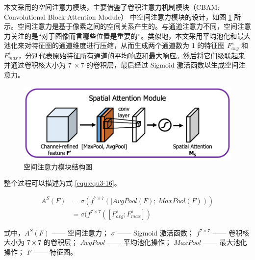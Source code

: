 本文采用的空间注意力模块，主要借鉴了卷积注意力机制模块（CBAM: Convolutional Block Attention Module）\cite{DBLP:conf/eccv/WooPLK18} 中空间注意力模块的设计，如图 \ref{fig:fig3-7} 所示。空间注意力是基于像素之间的空间关系产生的。与通道注意力不同，空间注意力关注的是“对于图像而言哪些位置是重要的”。类似地，本文采用平均池化和最大池化来对特征图的通道维度进行压缩，从而生成两个通道数为 1 的特征图 $F_{avg}^s$ 和 $F_{max}^s$，分别代表原始特征所有通道的平均响应和最大响应。然后将它们级联起来并通过卷积核大小为 $7\ \times 7$ 的卷积层，最后经过 Sigmoid 激活函数以生成空间注意力。

\begin{figure}[!htbp]
	\centering
	\includegraphics{figures/24.png}
	\caption{空间注意力模块结构图}
	\label{fig:fig3-7}
	\vspace{-0.8cm}  %
\end{figure}

整个过程可以描述为式 \ref{equ:equ3-16}。

\begin{equation}
\begin{aligned}
	A^S\left(F\right)&=\sigma\left(f^{7\times7}\left([AvgPool\left(F\right);\ MaxPool\left(F\right)\right)\right)\\
	&=\sigma(f^{7\times 7}([F_{avg}^s; F_{max}^s])
\end{aligned}
\label{equ:equ3-16}
\end{equation}

\noindent 式中，$A^S\left(F\right)$ —— 空间注意力；\newline
\indent\quad $\sigma$ —— Sigmoid 激活函数；\newline
\indent\quad $f^{7\times7}$ —— 卷积核大小为 $7 \times 7$ 的卷积层；\newline
\indent\quad $AvgPool$ —— 平均池化操作；\newline
\indent\quad $MaxPool$ —— 最大池化操作；\newline
\indent\quad $F$ —— 特征图。

